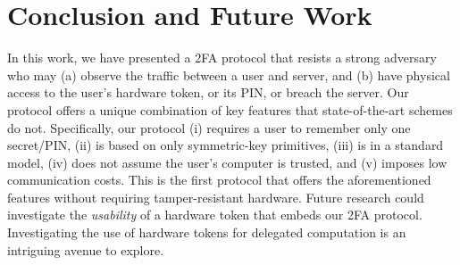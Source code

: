 

\section{Conclusion and Future Work}

In this work, we have presented a 2FA protocol that resists a strong adversary who may (a) observe the traffic between a user and server, and (b) have physical access to the user’s hardware token, or its PIN, or breach the server. Our protocol offers a unique combination of key features that state-of-the-art schemes do not. Specifically,  our protocol (i) requires a user to remember only one secret/PIN, (ii) is based on only symmetric-key primitives, (iii) is in a standard model, (iv) does not assume the user's computer is trusted, and (v) imposes low communication costs. 
% 
This is the first protocol that offers the aforementioned features without requiring tamper-resistant hardware. 
%
Future research could investigate the \emph{usability} of a hardware token that embeds our 2FA protocol. Investigating the use of hardware tokens for delegated computation is an intriguing avenue to explore.




